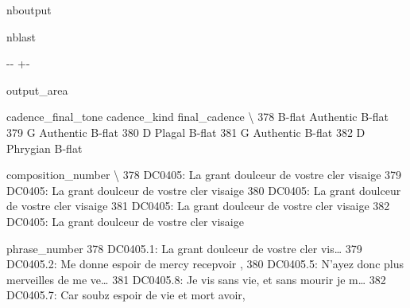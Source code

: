 \documentclass[letterpaper,10pt,english]{sphinxmanual}
\newlength\nbsphinxcodecellspacing
\begin{document}
\begin{sphinxuseclass}{nboutput}
\begin{sphinxuseclass}{nblast}
{

\kern-\sphinxverbatimsmallskipamount\kern-\baselineskip
\kern+\FrameHeightAdjust\kern-\fboxrule
\vspace{\nbsphinxcodecellspacing}

\begin{sphinxuseclass}{output_area}
\begin{sphinxuseclass}{}


\begin{sphinxVerbatim}[commandchars=\\\{\}]
\llap{\color{nbsphinxout}[35]:\,\hspace{\fboxrule}\hspace{\fboxsep}}    cadence\_final\_tone cadence\_kind final\_cadence  \textbackslash{}
378             B-flat    Authentic        B-flat
379                  G    Authentic        B-flat
380                  D       Plagal        B-flat
381                  G    Authentic        B-flat
382                  D     Phrygian        B-flat

                                   composition\_number  \textbackslash{}
378  DC0405: La grant doulceur de vostre cler visaige
379  DC0405: La grant doulceur de vostre cler visaige
380  DC0405: La grant doulceur de vostre cler visaige
381  DC0405: La grant doulceur de vostre cler visaige
382  DC0405: La grant doulceur de vostre cler visaige

                                         phrase\_number
378  DC0405.1: La grant doulceur de vostre cler vis{\ldots}
379     DC0405.2: Me donne espoir de mercy recepvoir ,
380  DC0405.5: N'ayez donc plus merveilles de me ve{\ldots}
381  DC0405.8: Je vis sans vie, et sans mourir je m{\ldots}
382   DC0405.7: Car soubz espoir de vie et mort avoir,
\end{sphinxVerbatim}



\end{sphinxuseclass}
\end{sphinxuseclass}
}

\end{sphinxuseclass}
\end{sphinxuseclass}
\end{document}
